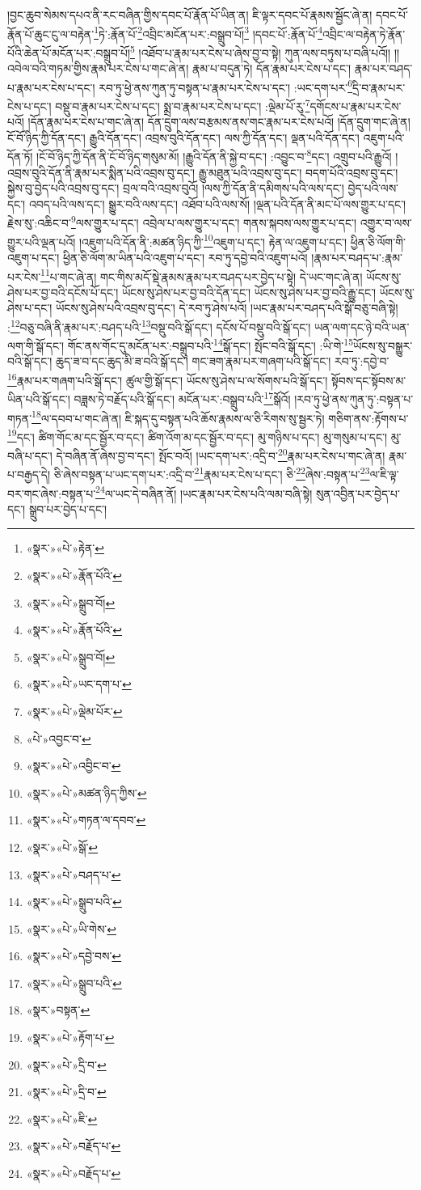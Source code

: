 །བྱང་ཆུབ་སེམས་དཔའ་ནི་རང་བཞིན་གྱིས་དབང་པོ་རྣོན་པོ་ཡིན་ན། ཇི་ལྟར་དབང་པོ་རྣམས་སྦྱོང་ཞེ་ན། དབང་པོ་རྣོན་པོ་ཆུང་ངུ་ལ་བརྟེན་\footnote{«སྣར་»«པེ་»རྟེན་}ཏེ་:རྣོན་པོ་\footnote{«སྣར་»«པེ་»རྣོན་པོའི་}འབྲིང་མངོན་པར་:བསྒྲུབ་པོ།\footnote{«སྣར་»«པེ་»སྒྲུབ་བོ།} །དབང་པོ་:རྣོན་པོ་\footnote{«སྣར་»«པེ་»རྣོན་པོའི་}འབྲིང་ལ་བརྟེན་ཏེ་རྣོན་པོའི་ཆེན་པོ་མངོན་པར་:བསྒྲུབ་པོ།\footnote{«སྣར་»«པེ་»སྒྲུབ་བོ།} །འཐོབ་པ་རྣམ་པར་ངེས་པ་ཞེས་བྱ་བ་སྟེ། ཀུན་ལས་བཏུས་པ་བཞི་པའོ།། །།འབེལ་བའི་གཏམ་གྱིས་རྣམ་པར་ངེས་པ་གང་ཞེ་ན། རྣམ་པ་བདུན་ཏེ། དོན་རྣམ་པར་ངེས་པ་དང་། རྣམ་པར་བཤད་པ་རྣམ་པར་ངེས་པ་དང་། རབ་ཏུ་ཕྱེ་ནས་ཀུན་ཏུ་བསྟན་པ་རྣམ་པར་ངེས་པ་དང་། :ཡང་དག་པར་\footnote{«སྣར་»«པེ་»ཡང་དག་པ་}དྲི་བ་རྣམ་པར་ངེས་པ་དང་། བསྡུ་བ་རྣམ་པར་ངེས་པ་དང་། སྨྲ་བ་རྣམ་པར་ངེས་པ་དང་། :ལྡེམ་པོ་རུ་\footnote{«སྣར་»«པེ་»ལྡེམ་པོར་}དགོངས་པ་རྣམ་པར་ངེས་པའོ། །དོན་རྣམ་པར་ངེས་པ་གང་ཞེ་ན། དོན་དྲུག་ལས་བརྩམས་ནས་གང་རྣམ་པར་ངེས་པའོ། །དོན་དྲུག་གང་ཞེ་ན། ངོ་བོ་ཉིད་ཀྱི་དོན་དང་། རྒྱུའི་དོན་དང་། འབྲས་བུའི་དོན་དང་། ལས་ཀྱི་དོན་དང་། ལྡན་པའི་དོན་དང་། འཇུག་པའི་དོན་ཏོ། །ངོ་བོ་ཉིད་ཀྱི་དོན་ནི་ངོ་བོ་ཉིད་གསུམ་མོ། །རྒྱུའི་དོན་ནི་སྐྱེ་བ་དང་། :འབྱུང་བ་\footnote{«པེ་»འབྱང་བ་}དང་། འགྲུབ་པའི་རྒྱུའོ། །འབྲས་བུའི་དོན་ནི་རྣམ་པར་སྨིན་པའི་འབྲས་བུ་དང་། རྒྱུ་མཐུན་པའི་འབྲས་བུ་དང་། བདག་པོའི་འབྲས་བུ་དང་། སྐྱེས་བུ་བྱེད་པའི་འབྲས་བུ་དང་། བྲལ་བའི་འབྲས་བུའོ། །ལས་ཀྱི་དོན་ནི་དམིགས་པའི་ལས་དང་། བྱེད་པའི་ལས་དང་། འབད་པའི་ལས་དང་། སྒྱུར་བའི་ལས་དང་། འཐོབ་པའི་ལས་སོ། །ལྡན་པའི་དོན་ནི་མང་པོ་ལས་གྱུར་པ་དང་། རྗེས་སུ་:འཆིང་བ་\footnote{«སྣར་»«པེ་»འབྱིང་བ་}ལས་གྱུར་པ་དང་། འབྲེལ་པ་ལས་གྱུར་པ་དང་། གནས་སྐབས་ལས་གྱུར་པ་དང་། འགྱུར་བ་ལས་གྱུར་པའི་ལྡན་པའོ། །འཇུག་པའི་དོན་ནི་:མཚན་ཉིད་ཀྱི་\footnote{«སྣར་»«པེ་»མཚན་ཉིད་ཀྱིས་}འཇུག་པ་དང་། རྟེན་ལ་འཇུག་པ་དང་། ཕྱིན་ཅི་ལོག་གི་འཇུག་པ་དང་། ཕྱིན་ཅི་ལོག་མ་ཡིན་པའི་འཇུག་པ་དང་། རབ་ཏུ་དབྱེ་བའི་འཇུག་པའོ། །རྣམ་པར་བཤད་པ་:རྣམ་པར་ངེས་\footnote{«སྣར་»«པེ་»གཏན་ལ་དབབ་}པ་གང་ཞེ་ན། གང་གིས་མདོ་སྡེ་རྣམས་རྣམ་པར་བཤད་པར་བྱེད་པ་སྟེ། དེ་ཡང་གང་ཞེ་ན། ཡོངས་སུ་ཤེས་པར་བྱ་བའི་དངོས་པོ་དང་། ཡོངས་སུ་ཤེས་པར་བྱ་བའི་དོན་དང་། ཡོངས་སུ་ཤེས་པར་བྱ་བའི་རྒྱུ་དང་། ཡོངས་སུ་ཤེས་པ་དང་། ཡོངས་སུ་ཤེས་པའི་འབྲས་བུ་དང་། དེ་རབ་ཏུ་ཤེས་པའོ། །ཡང་རྣམ་པར་བཤད་པའི་སྒོ་བཅུ་བཞི་སྟེ། :\footnote{«སྣར་»«པེ་»སྒོ་}བཅུ་བཞི་ནི་རྣམ་པར་:བཤད་པའི་\footnote{«སྣར་»«པེ་»བཤད་པ་}བསྡུ་བའི་སྒོ་དང་། དངོས་པོ་བསྡུ་བའི་སྒོ་དང་། ཡན་ལག་དང་ཉེ་བའི་ཡན་ལག་གི་སྒོ་དང་། གོང་ནས་གོང་དུ་མངོན་པར་:བསྒྲུབ་པའི་\footnote{«སྣར་»«པེ་»སྒྲུབ་པའི་}སྒོ་དང་། སྤོང་བའི་སྒོ་དང་། :ཡི་གེ་\footnote{«སྣར་»«པེ་»ཡི་གེས་}ཡོངས་སུ་བསྒྱུར་བའི་སྒོ་དང་། ཆུད་ཟ་བ་དང་ཆུད་མི་ཟ་བའི་སྒོ་དང་། གང་ཟག་རྣམ་པར་གཞག་པའི་སྒོ་དང་། རབ་ཏུ་:དབྱེ་བ་\footnote{«སྣར་»«པེ་»དབྱེ་བས་}རྣམ་པར་གཞག་པའི་སྒོ་དང་། ཚུལ་གྱི་སྒོ་དང་། ཡོངས་སུ་ཤེས་པ་ལ་སོགས་པའི་སྒོ་དང་། སྟོབས་དང་སྟོབས་མ་ཡིན་པའི་སྒོ་དང་། བཟླས་ཏེ་བརྗོད་པའི་སྒོ་དང་། མངོན་པར་:བསྒྲུབ་པའི་\footnote{«སྣར་»«པེ་»སྒྲུབ་པའི་}སྒོའོ། །རབ་ཏུ་ཕྱེ་ནས་ཀུན་ཏུ་:བསྟན་པ་གཏན་\footnote{«སྣར་»བསྟན་}ལ་དབབ་པ་གང་ཞེ་ན། ཇི་སྐད་དུ་བསྟན་པའི་ཆོས་རྣམས་ལ་ཅི་རིགས་སུ་སྦྱར་ཏེ། གཅིག་ནས་:རྟོགས་པ་\footnote{«སྣར་»«པེ་»རྟོག་པ་}དང་། ཚིག་གོང་མ་དང་སྦྱོར་བ་དང་། ཚིག་འོག་མ་དང་སྦྱོར་བ་དང་། མུ་གཉིས་པ་དང་། མུ་གསུམ་པ་དང་། མུ་བཞི་པ་དང་། དེ་བཞིན་ནོ་ཞེས་བྱ་བ་དང་། སྤོང་བའོ། །ཡང་དག་པར་:འདྲི་བ་\footnote{«སྣར་»«པེ་»དྲི་བ་}རྣམ་པར་ངེས་པ་གང་ཞེ་ན། རྣམ་པ་བརྒྱད་དེ། ཅི་ཞེས་བསྟན་པ་ཡང་དག་པར་:འདྲི་བ་\footnote{«སྣར་»«པེ་»དྲི་བ་}རྣམ་པར་ངེས་པ་དང་། ཅི་\footnote{«སྣར་»«པེ་»ཇི་}ཞེས་:བསྟན་པ་\footnote{«སྣར་»«པེ་»བརྗོད་པ་}ལ་ཇི་ལྟ་བར་གང་ཞེས་:བསྟན་པ་\footnote{«སྣར་»«པེ་»བརྗོད་པ་}ལ་ཡང་དེ་བཞིན་ནོ། །ཡང་རྣམ་པར་ངེས་པའི་ལམ་བཞི་སྟེ། སུན་འབྱིན་པར་བྱེད་པ་དང་། སྒྲུབ་པར་བྱེད་པ་དང་། 